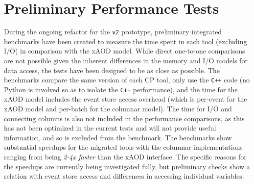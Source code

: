 \section{Preliminary Performance Tests}\label{sec:performance}

During the ongoing refactor for the \texttt{v2} prototype, preliminary integrated benchmarks have been created to measure the time spent in each tool (excluding I/O) in comparison with the xAOD model.
While direct one-to-one comparisons are not possible given the inherent differences in the memory and I/O models for data access, the tests have been designed to be as close as possible.
The benchmarks compare the same version of each CP tool, only use the \texttt{C++} code (no Python is involved so as to isolate the \texttt{C++} performance), and the time for the xAOD model includes the event store access overhead (which is per-event for the xAOD model and per-batch for the columnar model).
The time for I/O and connecting columns is also not included in the performance comparisons, as this has not been optimized in the current tests and will not provide useful information, and so is excluded from the benchmark.
The benchmarks show substantial speedups for the migrated tools with the columnar implementations ranging from being \emph{2-4x faster} than the xAOD interface.
The specific reasons for the speedups are currently being investigated fully, but preliminary checks show a relation with event store access and differences in accessing individual variables.
